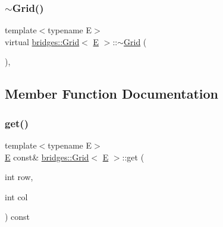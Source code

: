 \subsubsection{\texorpdfstring{$\sim$Grid()}{~Grid()}}
{\footnotesize\ttfamily template$<$typename E$>$ \\
virtual \mbox{\hyperlink{classbridges_1_1_grid}{bridges\+::\+Grid}}$<$ \mbox{\hyperlink{namespacebridges_acfb0a4f7877d8f63de3e6862004c50eda3a3ea00cfc35332cedf6e5e9a32e94da}{E}} $>$\+::$\sim$\mbox{\hyperlink{classbridges_1_1_grid}{Grid}} (\begin{DoxyParamCaption}{ }\end{DoxyParamCaption})\hspace{0.3cm}{\ttfamily [inline]}, {\ttfamily [virtual]}}



\subsection{Member Function Documentation}
\mbox{\label{classbridges_1_1_grid_a6d6a2db1f64de5cbe4786f2f923cd4ba}} 
\subsubsection{\texorpdfstring{get()}{get()}}
{\footnotesize\ttfamily template$<$typename E$>$ \\
\mbox{\hyperlink{namespacebridges_acfb0a4f7877d8f63de3e6862004c50eda3a3ea00cfc35332cedf6e5e9a32e94da}{E}} const\& \mbox{\hyperlink{classbridges_1_1_grid}{bridges\+::\+Grid}}$<$ \mbox{\hyperlink{namespacebridges_acfb0a4f7877d8f63de3e6862004c50eda3a3ea00cfc35332cedf6e5e9a32e94da}{E}} $>$\+::get (\begin{DoxyParamCaption}\item[{int}]{row,  }\item[{int}]{col }\end{DoxyParamCaption}) const\hspace{0.3cm}{\ttfamily [inline]}}

\mbox{\label{classbridges_1_1_grid_ad21e4fc94483ef822fda9b74a52b9f48}} 
